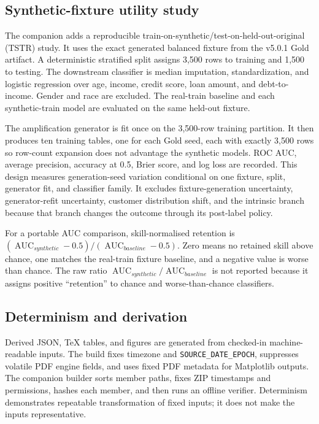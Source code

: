 \subsection{Synthetic-fixture utility study}

The companion adds a reproducible train-on-synthetic/test-on-held-out-original (TSTR) study. It
uses the exact generated balanced fixture from the v5.0.1 Gold artifact. A deterministic stratified
split assigns 3,500 rows to training and 1,500 to testing. The downstream classifier is median
imputation, standardization, and logistic regression over age, income, credit score, loan amount,
and debt-to-income. Gender and race are excluded. The real-train baseline and each synthetic-train
model are evaluated on the same held-out fixture.

The amplification generator is fit once on the 3,500-row training partition. It then produces ten
training tables, one for each Gold seed, each with exactly 3,500 rows so row-count expansion does
not advantage the synthetic models. ROC AUC, average precision, accuracy at 0.5, Brier score, and
log loss are recorded. This design measures generation-seed variation conditional on one fixture,
split, generator fit, and classifier family. It excludes fixture-generation uncertainty,
generator-refit uncertainty, customer distribution shift, and the intrinsic branch because that
branch changes the outcome through its post-label policy.

For a portable AUC comparison, skill-normalised retention is
$(\operatorname{AUC}_{synthetic}-0.5)/(\operatorname{AUC}_{baseline}-0.5)$. Zero means no retained
skill above chance, one matches the real-train fixture baseline, and a negative value is worse than
chance. The raw ratio $\operatorname{AUC}_{synthetic}/\operatorname{AUC}_{baseline}$ is not reported
because it assigns positive ``retention'' to chance and worse-than-chance classifiers.

\subsection{Determinism and derivation}

Derived JSON, TeX tables, and figures are generated from checked-in machine-readable inputs. The
build fixes timezone and \texttt{SOURCE\_DATE\_EPOCH}, suppresses volatile PDF engine fields, and
uses fixed PDF metadata for Matplotlib outputs. The companion builder sorts member paths, fixes ZIP
timestamps and permissions, hashes each member, and then runs an offline verifier. Determinism
demonstrates repeatable transformation of fixed inputs; it does not make the inputs representative.
